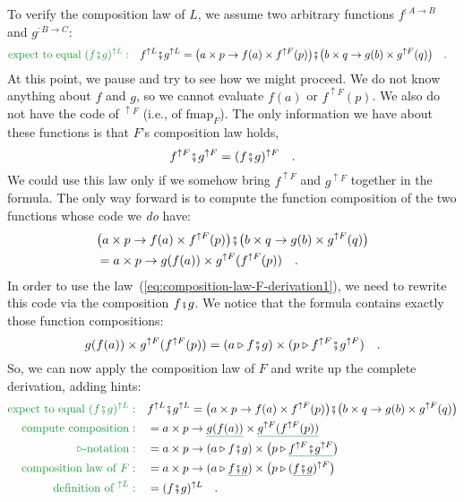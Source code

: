 To verify the composition law of $L$, we assume two arbitrary functions
$f^{:A\rightarrow B}$ and $g^{:B\rightarrow C}$:
\begin{align*}
{\color{greenunder}\text{expect to equal }(f\bef g)^{\uparrow L}:}\quad & f^{\uparrow L}\bef g^{\uparrow L}=\big(a\times p\rightarrow f(a)\times f^{\uparrow F}(p)\big)\bef\big(b\times q\rightarrow g(b)\times g^{\uparrow F}(q)\big)\quad.
\end{align*}
At this point, we pause and try to see how we might proceed. We do
not know anything about $f$ and $g$, so we cannot evaluate $f(a)$
or $f^{\uparrow F}(p)$. We also do not have the code of $^{\uparrow F}$
(i.e., of $\text{fmap}_{F}$). The only information we have about
these functions is that $F$\textsf{'}s composition law holds,
\begin{equation}
f^{\uparrow F}\bef g^{\uparrow F}=(f\bef g)^{\uparrow F}\quad.\label{eq:composition-law-F-derivation1}
\end{equation}
We could use this law only if we somehow bring $f^{\uparrow F}$ and
$g^{\uparrow F}$ together in the formula. The only way forward is
to compute the function composition of the two functions whose code
we \emph{do} have:
\begin{align*}
 & \big(a\times p\rightarrow f(a)\times f^{\uparrow F}(p)\big)\bef\big(b\times q\rightarrow g(b)\times g^{\uparrow F}(q)\big)\\
 & =a\times p\rightarrow g(f(a))\times g^{\uparrow F}(f^{\uparrow F}(p))\quad.
\end{align*}
In order to use the law~(\ref{eq:composition-law-F-derivation1}),
we need to rewrite this code via the composition $f\bef g$. We notice
that the formula contains exactly those function compositions:
\[
g(f(a))\times g^{\uparrow F}(f^{\uparrow F}(p))=(a\triangleright f\bef g)\times(p\triangleright f^{\uparrow F}\bef g^{\uparrow F})\quad.
\]
So, we can now apply the composition law of $F$ and write up the
complete derivation, adding hints:
\begin{align*}
{\color{greenunder}\text{expect to equal }(f\bef g)^{\uparrow L}:}\quad & f^{\uparrow L}\bef g^{\uparrow L}=\big(a\times p\rightarrow f(a)\times f^{\uparrow F}(p)\big)\bef\big(b\times q\rightarrow g(b)\times g^{\uparrow F}(q)\big)\\
{\color{greenunder}\text{compute composition}:}\quad & =a\times p\rightarrow\gunderline{g(f(a))}\times\gunderline{g^{\uparrow F}(f^{\uparrow F}(p))}\\
{\color{greenunder}\triangleright\text{-notation}:}\quad & =a\times p\rightarrow(a\triangleright f\bef g)\times\big(p\triangleright\gunderline{f^{\uparrow F}\bef g^{\uparrow F}}\big)\\
{\color{greenunder}\text{composition law of }F:}\quad & =a\times p\rightarrow(a\triangleright\gunderline{f\bef g})\times\big(p\triangleright(\gunderline{f\bef g})^{\uparrow F}\big)\\
{\color{greenunder}\text{definition of }^{\uparrow L}:}\quad & =(f\bef g)^{\uparrow L}\quad.
\end{align*}

